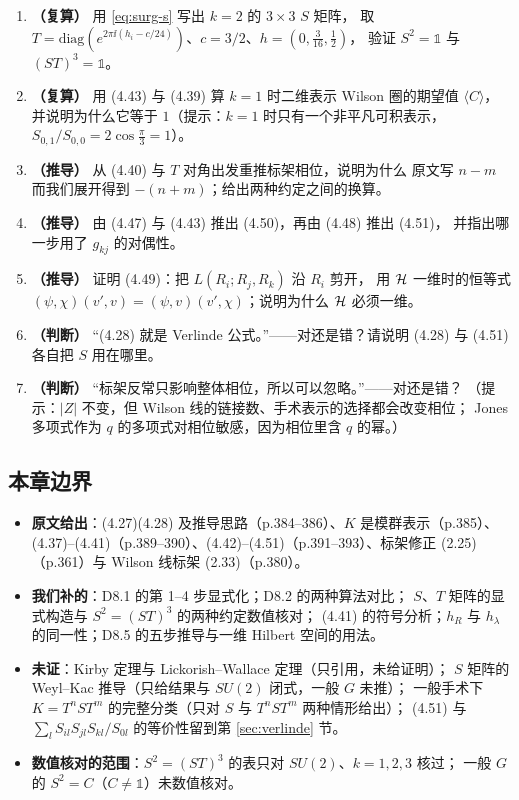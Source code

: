 \begin{enumerate}[leftmargin=2em]
\item \textbf{（复算）} 用 \eqref{eq:surg-s} 写出 $k=2$ 的 $3\times3$ $S$ 矩阵，
取 $T=\mathrm{diag}(e^{2\pi\ii(h_i-c/24)})$、$c=3/2$、$h=(0,\frac{3}{16},\frac12)$，
验证 $S^2=\mathbb 1$ 与 $(ST)^3=\mathbb 1$。
\item \textbf{（复算）} 用 (4.43) 与 (4.39) 算 $k=1$ 时二维表示 Wilson 圈的期望值
$\langle C\rangle$，并说明为什么它等于 $1$（提示：$k=1$ 时只有一个非平凡可积表示，
$S_{0,1}/S_{0,0}=2\cos\frac{\pi}{3}=1$）。
\item \textbf{（推导）} 从 (4.40) 与 $T$ 对角出发重推标架相位，说明为什么
原文写 $n-m$ 而我们展开得到 $-(n+m)$；给出两种约定之间的换算。
\item \textbf{（推导）} 由 (4.47) 与 (4.43) 推出 (4.50)，再由 (4.48) 推出 (4.51)，
并指出哪一步用了 $g_{kj}$ 的对偶性。
\item \textbf{（推导）} 证明 (4.49)：把 $L(R_i;R_j,R_k)$ 沿 $R_i$ 剪开，
用 $\mathcal{H}$ 一维时的恒等式 $(\psi,\chi)(v',v)=(\psi,v)(v',\chi)$；说明为什么 $\mathcal{H}$ 必须一维。
\item \textbf{（判断）} “(4.28) 就是 Verlinde 公式。”——对还是错？请说明 (4.28) 与 (4.51)
各自把 $S$ 用在哪里。
\item \textbf{（判断）} “标架反常只影响整体相位，所以可以忽略。”——对还是错？
（提示：$|Z|$ 不变，但 Wilson 线的链接数、手术表示的选择都会改变相位；
Jones 多项式作为 $q$ 的多项式对相位敏感，因为相位里含 $q$ 的幂。）
\end{enumerate}

\subsection{本章边界}

\begin{boundary}
\begin{itemize}[leftmargin=1.4em]
\item \textbf{原文给出}：(4.27)(4.28) 及推导思路（p.384--386）、$K$ 是模群表示（p.385）、
(4.37)--(4.41)（p.389--390）、(4.42)--(4.51)（p.391--393）、标架修正 (2.25)（p.361）与
Wilson 线标架 (2.33)（p.380）。
\item \textbf{我们补的}：D8.1 的第 1--4 步显式化；D8.2 的两种算法对比；
$S$、$T$ 矩阵的显式构造与 $S^2=(ST)^3$ 的两种约定数值核对；
(4.41) 的符号分析；$h_R$ 与 $h_\lambda$ 的同一性；D8.5 的五步推导与一维 Hilbert 空间的用法。
\item \textbf{未证}：Kirby 定理与 Lickorish--Wallace 定理（只引用，未给证明）；
$S$ 矩阵的 Weyl--Kac 推导（只给结果与 $SU(2)$ 闭式，一般 $G$ 未推）；
一般手术下 $K=T^nST^m$ 的完整分类（只对 $S$ 与 $T^nST^m$ 两种情形给出）；
(4.51) 与 $\sum_lS_{il}S_{jl}S_{kl}/S_{0l}$ 的等价性留到第 \ref{sec:verlinde} 节。
\item \textbf{数值核对的范围}：$S^2=(ST)^3$ 的表只对 $SU(2)$、$k=1,2,3$ 核过；
一般 $G$ 的 $S^2=C$（$C\neq\mathbb 1$）未数值核对。
\end{itemize}
\end{boundary}
